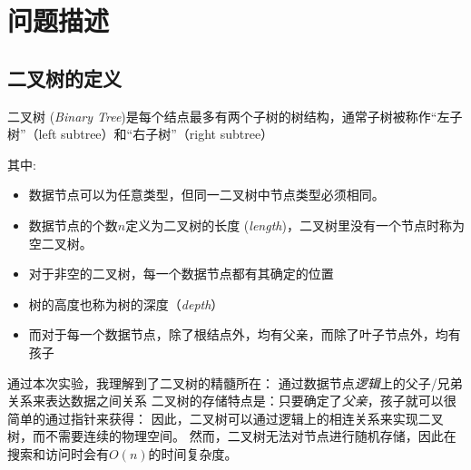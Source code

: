 \section{问题描述}
\subsection{二叉树的定义}
\begin{definition}\label{def:binarytree3}
    二叉树 (\emph{Binary Tree})是每个结点最多有两个子树的树结构，通常子树被称作“左子树”（left subtree）和“右子树”（right subtree）
\end{definition}
其中:
\begin{itemize}
    \item 数据节点可以为任意类型，但同一二叉树中节点类型必须相同。
    \item 数据节点的个数$n$定义为二叉树的长度 (\emph{length})，二叉树里没有一个节点时称为空二叉树。
    \item 对于非空的二叉树，每一个数据节点都有其确定的位置
    \item 树的高度也称为树的深度（\emph{depth}）
    \item 而对于每一个数据节点，除了根结点外，均有父亲，而除了叶子节点外，均有孩子
\end{itemize}
通过本次实验，我理解到了二叉树的精髓所在：
通过数据节点\emph{逻辑}上的父子/兄弟关系来表达数据之间关系
\newline
二叉树的存储特点是：只要确定了\emph{父亲}，孩子就可以很简单的通过指针来获得：
因此，二叉树可以通过逻辑上的相连关系来实现二叉树，而不需要连续的物理空间。
然而，二叉树无法对节点进行随机存储，因此在搜索和访问时会有$O(n)$的时间复杂度。
